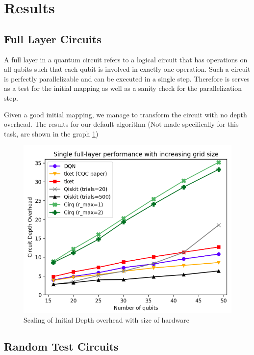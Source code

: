 \documentclass[%
 reprint,
 amsmath,amssymb,
 aps,
]{revtex4-2}
\begin{document}
\section{\label{sec:results}Results}

\subsection{\label{sec:results-full}Full Layer Circuits}

A full layer in a quantum circuit refers to a logical circuit that has operations on all qubits such that each qubit is involved in exactly one operation. Such a circuit is perfectly parallelizable and can be executed in a single step. Therefore is serves as a test for the initial mapping as well as a sanity check for the parallelization step.

Given a good initial mapping, we manage to transform the circuit with no depth overhead. The results for our default algorithm (Not made specifically for this task, are shown in the graph \ref{fig:results-full})

\begin{figure}[H]
    \includegraphics[width=\linewidth]{images/results-full.png}
    \caption{\label{fig:results-full}
        Scaling of Initial Depth overhead with size of hardware}
\end{figure}

\subsection{\label{sec:results-random}Random Test Circuits}
\end{document}
